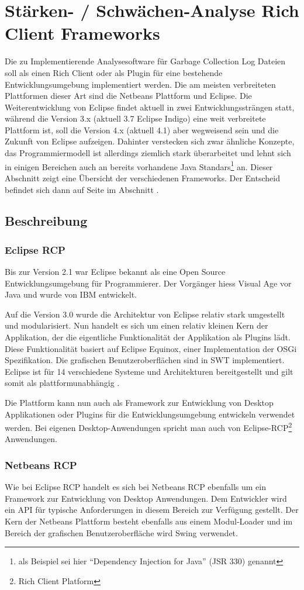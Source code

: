 \chapter{Stärken- / Schwächen-Analyse Rich Client Frameworks}
Die zu Implementierende Analysesoftware für Garbage Collection Log Dateien soll als einen Rich Client oder als Plugin für eine bestehende Entwicklungsumgebung implementiert werden. Die am meisten verbreiteten Plattformen dieser Art sind die Netbeans Plattform und Eclipse. Die Weiterentwicklung von Eclipse findet aktuell in zwei Entwicklungssträngen statt, während die Version 3.x (aktuell 3.7 Eclipse Indigo) eine weit verbreitete Plattform ist, soll die Version 4.x (aktuell 4.1) aber wegweisend sein und die Zukunft von Eclipse aufzeigen. Dahinter verstecken sich zwar ähnliche Konzepte, das Programmiermodell ist allerdings ziemlich stark überarbeitet und lehnt sich in einigen Bereichen auch an bereits vorhandene Java Standars\footnote{als Beispiel sei hier ``Dependency Injection for Java'' (JSR 330) genannt} an. Dieser Abschnitt zeigt eine Übersicht der verschiedenen Frameworks. Der Entscheid befindet sich dann auf Seite \pageref{rcp_entscheid} im Abschnitt  .

\section{Beschreibung}
\subsection{Eclipse RCP}
Bis zur Version 2.1 war Eclipse bekannt als eine Open Source Entwicklungsumgebung für Programmierer. Der Vorgänger hiess Visual Age vor Java und wurde von IBM entwickelt. 

Auf die Version 3.0 wurde die Architektur von Eclipse relativ stark umgestellt und modularisiert. Nun handelt es sich um einen relativ kleinen Kern der Applikation, der die eigentliche Funktionalität der Applikation als Plugins lädt. Diese Funktionalität basiert auf Eclipse Equinox, einer Implementation der OSGi Spezifikation. Die grafischen Benutzeroberflächen sind in SWT implementiert. Eclipse ist für 14 verschiedene Systeme und Architekturen bereitgestellt und gilt somit als plattformunabhängig \cite{wiki:eclipse}. 

Die Plattform kann nun auch als Framework zur Entwicklung von Desktop Applikationen oder Plugins für die Entwicklungsumgebung entwickeln verwendet werden. Bei eigenen Desktop-Anwendungen spricht man auch von Eclipse-RCP\footnote{Rich Client Platform} Anwendungen.



\subsection{Netbeans RCP}
Wie bei Eclipse RCP handelt es sich bei Netbeans RCP ebenfalls um ein Framework zur Entwicklung von Desktop Anwendungen. Dem Entwickler wird ein API für typische Anforderungen in diesem Bereich zur Verfügung gestellt. Der Kern der Netbeans Plattform besteht ebenfalls aus einem Modul-Loader und im Bereich der grafischen Benutzeroberfläche wird Swing verwendet.